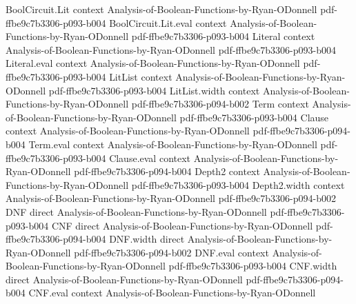 \begin{theorem}
\label{RestrictionFourier.bernoulliRestrProb_subset_freeVars}
\leanok
{}
\proofstep
  {BoolCircuit.Lit}
  {context}
  {Analysis-of-Boolean-Functions-by-Ryan-ODonnell}
  {pdf-ffbe9c7b3306-p093-b004}
\proofstep
  {BoolCircuit.Lit.eval}
  {context}
  {Analysis-of-Boolean-Functions-by-Ryan-ODonnell}
  {pdf-ffbe9c7b3306-p093-b004}
\proofstep
  {Literal}
  {context}
  {Analysis-of-Boolean-Functions-by-Ryan-ODonnell}
  {pdf-ffbe9c7b3306-p093-b004}
\proofstep
  {Literal.eval}
  {context}
  {Analysis-of-Boolean-Functions-by-Ryan-ODonnell}
  {pdf-ffbe9c7b3306-p093-b004}
\proofstep
  {LitList}
  {context}
  {Analysis-of-Boolean-Functions-by-Ryan-ODonnell}
  {pdf-ffbe9c7b3306-p093-b004}
\proofstep
  {LitList.width}
  {context}
  {Analysis-of-Boolean-Functions-by-Ryan-ODonnell}
  {pdf-ffbe9c7b3306-p094-b002}
\proofstep
  {Term}
  {context}
  {Analysis-of-Boolean-Functions-by-Ryan-ODonnell}
  {pdf-ffbe9c7b3306-p093-b004}
\proofstep
  {Clause}
  {context}
  {Analysis-of-Boolean-Functions-by-Ryan-ODonnell}
  {pdf-ffbe9c7b3306-p094-b004}
\proofstep
  {Term.eval}
  {context}
  {Analysis-of-Boolean-Functions-by-Ryan-ODonnell}
  {pdf-ffbe9c7b3306-p093-b004}
\proofstep
  {Clause.eval}
  {context}
  {Analysis-of-Boolean-Functions-by-Ryan-ODonnell}
  {pdf-ffbe9c7b3306-p094-b004}
\proofstep
  {Depth2}
  {context}
  {Analysis-of-Boolean-Functions-by-Ryan-ODonnell}
  {pdf-ffbe9c7b3306-p093-b004}
\proofstep
  {Depth2.width}
  {context}
  {Analysis-of-Boolean-Functions-by-Ryan-ODonnell}
  {pdf-ffbe9c7b3306-p094-b002}
\proofstep
  {DNF}
  {direct}
  {Analysis-of-Boolean-Functions-by-Ryan-ODonnell}
  {pdf-ffbe9c7b3306-p093-b004}
\proofstep
  {CNF}
  {direct}
  {Analysis-of-Boolean-Functions-by-Ryan-ODonnell}
  {pdf-ffbe9c7b3306-p094-b004}
\proofstep
  {DNF.width}
  {direct}
  {Analysis-of-Boolean-Functions-by-Ryan-ODonnell}
  {pdf-ffbe9c7b3306-p094-b002}
\proofstep
  {DNF.eval}
  {context}
  {Analysis-of-Boolean-Functions-by-Ryan-ODonnell}
  {pdf-ffbe9c7b3306-p093-b004}
\proofstep
  {CNF.width}
  {direct}
  {Analysis-of-Boolean-Functions-by-Ryan-ODonnell}
  {pdf-ffbe9c7b3306-p094-b004}
\proofstep
  {CNF.eval}
  {context}
  {Analysis-of-Boolean-Functions-by-Ryan-ODonnell}

\end{theorem}
